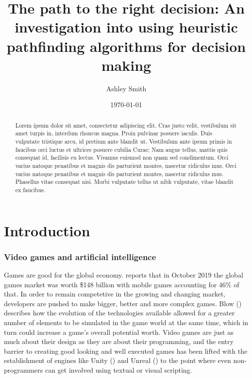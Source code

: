 \documentclass[10pt]{article}
\begin{document}
\title{\titlefont The path to the right decision: An investigation into using heuristic pathfinding algorithms for decision making}
\author{Ashley Smith}
\date{\today}
\maketitle

\renewcommand\abstractname{\textbf{Abstract}}
\begin{abstract}
Lorem ipsum dolor sit amet, consectetur adipiscing elit. Cras justo velit, vestibulum sit amet turpis in, interdum rhoncus magna. Proin pulvinar posuere iaculis. Duis vulputate tristique arcu, id pretium ante blandit ut. Vestibulum ante ipsum primis in faucibus orci luctus et ultrices posuere cubilia Curae; Nam augue tellus, mattis quis consequat id, facilisis eu lectus. Vivamus euismod non quam sed condimentum. Orci varius natoque penatibus et magnis dis parturient montes, nascetur ridiculus mus. Orci varius natoque penatibus et magnis dis parturient montes, nascetur ridiculus mus. Phasellus vitae consequat nisi. Morbi vulputate tellus ut nibh vulputate, vitae blandit ex faucibus.
\end{abstract}

\clearpage
\section{Introduction}

\subsubsection{Video games and artificial intelligence}

Games are good for the global economy. \citeauthor{Newzoo} reports that in October 2019 the global games market was worth \$148 billion with mobile games accounting for 46\% of that. In order to remain competetive in the growing and changing market, developers are pushed to make bigger, better and more complex games. Blow (\citeyear{blow2004game}) describes how the evolution of the technologies available allowed for a greater number of elements to be simulated in the game world at the same time, which in turn could increase a game's overall potential worth. Video games are just as much about their design as they are about their programming, and the entry barrier to creating good looking and well executed games has been lifted with the establishment of engines like Unity (\cite{Unity}) and Unreal (\cite{Unreal}) to the point where even non-programmers can get involved using textual or visual scripting.
\end{document}
